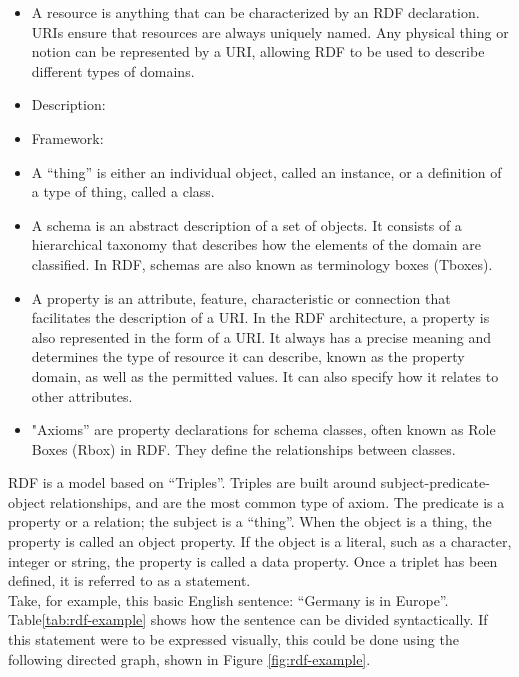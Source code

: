     \begin{itemize}
        \item A resource is anything that can be characterized by an RDF declaration. URIs ensure that resources are always uniquely named. Any physical thing or notion can be represented by a URI, allowing RDF to be used to describe different types of domains.
        \item Description:
        \item Framework:
        \item A “thing” is either an individual object, called an instance, or a definition of a type of thing, called a class. 
        \item A schema is an abstract description of a set of objects. It consists of a hierarchical taxonomy that describes how the elements of the domain are classified. In RDF, schemas are also known as terminology boxes (Tboxes). 
        \item A property is an attribute, feature, characteristic or connection that facilitates the description of a URI. In the RDF architecture, a property is also represented in the form of a URI. It always has a precise meaning and determines the type of resource it can describe, known as the property domain, as well as the permitted values. It can also specify how it relates to other attributes. 
        \item "Axioms” are property declarations for schema classes, often known as Role Boxes (Rbox) in RDF. They define the relationships between classes.
    \end{itemize}

    RDF is a model based on “Triples”. Triples are built around subject-predicate-object relationships, and are the most common type of axiom. The predicate is a property or a relation; the subject is a “thing”. When the object is a thing, the property is called an object property. If the object is a literal, such as a character, integer or string, the property is called a data property. Once a triplet has been defined, it is referred to as a statement.\\

    Take, for example, this basic English sentence: “Germany is in Europe”. Table\ref{tab:rdf-example} shows how the sentence can be divided syntactically. If this statement were to be expressed visually, this could be done using the following directed graph, shown in Figure \ref{fig:rdf-example}.\\
    
